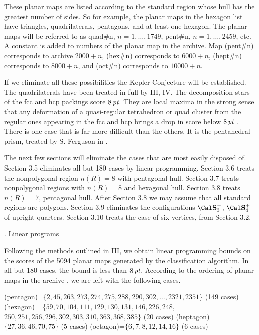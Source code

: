 These planar maps are listed according to the standard region whose
hull has the greatest number of sides.  So for example, the planar
maps in the hexagon list have triangles, quadrilaterals, pentagons,
and at least one hexagon. The planar maps will be referred
to as quad\#n, $n=1,\ldots,1749$, pent\#n, $n=1,\ldots,2459$, etc.
A constant is added to numbers of the planar map in the archive.
Map (pent\#n) corresponds to archive $2000+n$,
(hex\#n) corresponds to $6000+n$,
(hept\#n) corresponds to $8000+n$,
and (oct\#n) corresponds to $10000+n$.

If we eliminate all these possibilities the Kepler Conjecture
will be established.  The quadrilaterals have been treated in
full by III, IV.  The decomposition stars of the
fcc and hcp packings score $8\,\hbox{\it pt}$.  They are local
maxima in the strong sense that any deformation of a
quasi-regular tetrahedron or quad cluster from  the 
regular ones appearing in the fcc and hcp brings a drop
in score below $8\,\hbox{\it pt}$ \cite{II}.
There is one case that is far more difficult than the
others.  It is the pentahedral prism, treated by S. Ferguson
in \cite{V}.

The next few sections will eliminate the cases that are
most easily disposed of.
Section 3.5 eliminates all but 180 cases by linear programming.
Section 3.6 treats the nonpolygonal region $n(R)=8$ with
pentagonal hull.  Section 3.7 treats nonpolygonal regions
with $n(R)=8$ and hexagonal hull.  Section 3.8 treats
$n(R)=7$, pentagonal hull.  After Section 3.8 we may assume
that all standard regions are polygons.
Section 3.9 eliminates the configurations $\Sminus$, $\Sfour$
of upright quarters.  Section 3.10 treats the case of six vertices,
from Section 3.2.

. Linear programs\endsubhead

Following the methods outlined in III, we obtain linear programming
bounds on the scores of the 5094 planar maps generated by the
classification algorithm.  In all but 180 cases, the bound is
less than $8\,\hbox{\it pt}$.  According to the ordering of planar maps
in the archive \cite{H1}, we are left with the following cases.

{\obeylines
\parskip=0pt
\parindent=0pt
\hbox{}

(pentagon)=$\{2,45,263,273,274,275,288,290,302,\ldots,2321,2351\}$ (149 cases)
(hexagon)= $\{59,70,104,111,129,130,131,146,226,248,$
\hfill\quad\quad $250,251,256,296,302,303,310,363,368,385\}$ (20 cases)
(heptagon)=$\{27,36,46,70,75\}$ (5 cases)
(octagon)=$\{6,7,8,12,14,16\}$ (6 cases)

}

